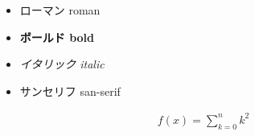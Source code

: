 \documentclass[a4j]{ltjsarticle}
\begin{document}
\begin{itemize}
	\item \textrm{ローマン roman}
	\item \textbf{ボールド bold}
	\item \textit{イタリック italic}
	\item \textsf{サンセリフ san-serif}
\end{itemize}

\begin{align}
	f(x) = \sum_{k=0}^{n} k^{2}
\end{align}
\end{document}
